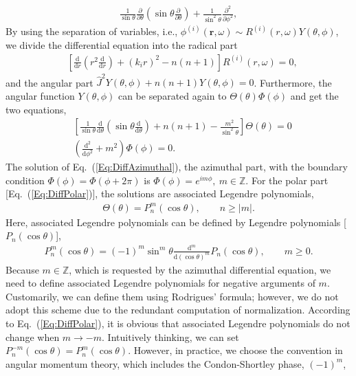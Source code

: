 \documentclass[journal=jacsat,manuscript=article,layout=traditional]{achemso}
\newcommand*\diff{\mathrm{d}}
\newcommand*\p[2]{\frac{\partial{#1} }{\partial {#2}}}
\begin{document}
\begin{appendix}
\begin{align}
    \frac{1}{\sin\theta}\p{}{\theta}\left(\sin\theta\p{}{\theta}\right) +
    \frac{1}{\sin^2\theta}\frac{\partial^2}{\partial\phi^2},
\end{align}
By using the separation of variables, i.e., $\phi^{(i)}(\mathbf{r},\omega) \sim R^{(i)}(r,\omega)Y(\theta,\phi)$, we divide the differential equation into the radical part
\begin{align}
    &\left[\frac{\diff}{\diff r}\left(r^2\frac{\diff}{\diff{r}}\right) +(k_ir)^2 - n(n+1)\right]R^{(i)}(r,\omega) = 0,
\end{align}
and the angular part $\hat{J}^2Y(\theta,\phi)+n(n+1)Y(\theta,\phi)=0$.
Furthermore, the angular function $Y(\theta,\phi)$ can be separated again to $\Theta(\theta)\Phi(\phi)$ and get the two equations,
\begin{align}
    \label{Eq:DiffPolar}
    &\left[\frac{1}{\sin\theta}\frac{\diff}{\diff\theta}\left(\sin\theta\frac{\diff}{\diff\theta}\right) + n(n+1) - \frac{m^2}{\sin^2\theta}\right]\Theta(\theta) = 0\\
    \label{Eq:DiffAzimuthal}
    &\left(\frac{\diff^2}{\diff\phi^2}+m^2\right)\Phi(\phi) = 0.
\end{align}
The solution of Eq.~(\ref{Eq:DiffAzimuthal}), the azimuthal part, with the boundary condition $\Phi(\phi) = \Phi(\phi+2\pi)$ is 
$\Phi(\phi) = e^{im\phi},~m\in\mathbb{Z}$.
For the polar part [Eq.~(\ref{Eq:DiffPolar})], the solutions are associated Legendre polynomials,
\begin{align}
    \Theta(\theta) = P_n^m(\cos\theta), \qquad n\geq|m|.
\end{align}
Here, associated Legendre polynomials can be defined by Legendre polynomials [$P_n(\cos\theta)$],
\begin{align}
    \label{Eq:alp}
    P_n^m(\cos{\theta}) = (-1)^m\sin^m{\theta}\frac{\diff^m}{\diff(\cos{\theta})^m}P_n(\cos\theta), \qquad m\geq 0.
\end{align}
Because $m\in\mathbb{Z}$, which is requested by the azimuthal differential equation, we need to define associated Legendre polynomials for negative arguments of $m$.
Customarily, we can define them using Rodrigues' formula; however, we do not adopt this scheme due to the redundant computation of normalization.
According to Eq.~(\ref{Eq:DiffPolar}), it is obvious that associated Legendre polynomials do not change when $m\rightarrow-m$.
Intuitively thinking, we can set $P_n^{-m}(\cos\theta)=P_n^m(\cos\theta)$.
However, in practice, we choose the convention in angular momentum theory, which includes the Condon-Shortley phase, $(-1)^m$,

\end{appendix}
\end{document}
